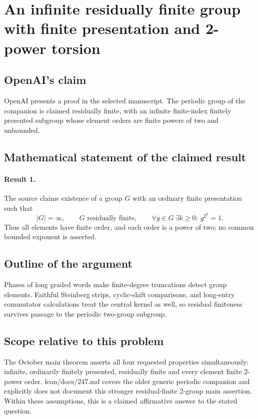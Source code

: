 \documentclass[11pt]{article}
\begin{document}
\section*{An infinite residually finite group with finite presentation and 2-power torsion}

\subsection{OpenAI's claim}
OpenAI presents a proof in the selected manuscript. The periodic group of the companion is claimed residually finite, with an infinite finite-index finitely presented subgroup whose element orders are finite powers of two and unbounded.

\subsection{Mathematical statement of the claimed result}
\paragraph{Result 1.} The source claims existence of a group \(G\) with an ordinary finite presentation such that
\[
 |G|=\infty,\qquad G\text{ residually finite},\qquad
 \forall g\in G\ \exists k\ge0:\ g^{2^k}=1.
\]
Thus all elements have finite order, and each order is a power of two; no common bounded exponent is asserted.

\subsection{Outline of the argument}
Phases of long graded words make finite-degree truncations detect group elements. Faithful Steinberg strips, cyclic-shift comparisons, and long-entry commutator calculations treat the central kernel as well, so residual finiteness survives passage to the periodic two-group subgroup.

\subsection{Scope relative to this problem}
The October main theorem asserts all four requested properties simultaneously: infinite, ordinarily finitely presented, residually finite and every element finite 2-power order. lean/docs/247.md covers the older generic periodic companion and explicitly does not document this stronger residual-finite 2-group main assertion. Within these assumptions, this is a claimed affirmative answer to the stated question.
\end{document}
